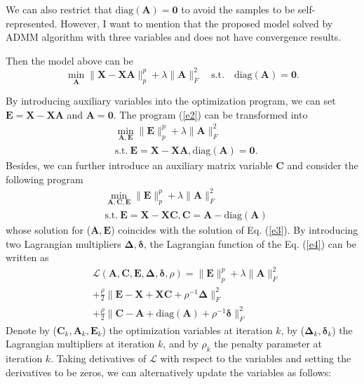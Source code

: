 \documentclass[10pt,twocolumn,letterpaper]{article}
\begin{document}
We can also restrict that $\text{diag}(\bm{A})=\bm{0}$ to avoid the samples to be self-represented. However, I want to mention that the proposed model solved by ADMM algorithm with three variables and does not have convergence results.

Then the model above can be 
\begin{equation}
\label{e2}
\min_{\bm{A}}
\|
\bm{X}
-
\bm{X}\bm{A}
\|_{p}^{p}
+
\lambda
\|
\bm{A}
\|_{F}^{2}
\quad
\text{s.t.}
\quad
\text{diag}(\bm{A})=\bm{0}.
\end{equation}

By introducing auxiliary variables into the optimization program, we can set 
$
\bm{E}
=
\bm{X}
-
\bm{X}\bm{A}
$ 
and 
$
\bm{A}
=
\bm{0}
$.
The program (\ref{e2}) can be transformed into
\begin{equation}
\begin{split}
\label{e3}
&
\min_{\bm{A},\bm{E}}
\|
\bm{E}
\|_{p}^{p}
+
\lambda
\|
\bm{A}
\|_{F}^{2}
\\
& 
\text{s.t.}
\ 
\bm{E}=\bm{X}-\bm{X}\bm{A}
,
\text{diag}(\bm{A})=\bm{0}.
\end{split}
\end{equation}
Besides, we can further introduce an auxiliary matrix variable $\bm{C}$ and consider the following program
\begin{equation}
\begin{split}
\label{e4}
&
\min_{\bm{A},\bm{C},\bm{E}}
\|
\bm{E}
\|_{p}^{p}
+
\lambda
\|
\bm{A}
\|_{F}^{2}
\\
& 
\text{s.t.}
\ 
\bm{E}=\bm{X}-\bm{X}\bm{C}
,
\bm{C}
=
\bm{A}
-
\text{diag}(\bm{A})
\end{split}
\end{equation}
whose solution for ($\bm{A},\bm{E}$) coincides with the solution of Eq. (\ref{e3}). By introducing two Lagrangian multipliers $\bm{\Delta},\bm{\delta}$, the Lagrangian function of the Eq. (\ref{e4}) can be written as
\begin{equation}
\begin{split}
\label{e5}
&
\mathcal{L}
(\bm{A},\bm{C},\bm{E},\bm{\Delta},\bm{\delta},\rho)
=
\|
\bm{E}
\|_{p}^{p}
+
\lambda
\|
\bm{A}
\|_{F}^{2}
\\
&
+
\frac{\rho}{2}
\|
\bm{E}-\bm{X}+\bm{X}\bm{C}+\rho^{-1}\bm{\Delta}
\|_{F}^{2}
\\
&
+
\frac{\rho}{2}
\|
\bm{C}-\bm{A}+\text{diag}(\bm{A})+\rho^{-1}\bm{\delta}
\|_{F}^{2}
\end{split}
\end{equation}
Denote by ($\bm{C}_{k},\bm{A}_{k},\bm{E}_{k}$) the optimization variables at iteration $k$, by ($\bm{\Delta}_{k},\bm{\delta}_{k}$) the Lagrangian multipliers at iteration $k$, and by $\rho_{k}$ the penalty parameter at iteration $k$. Taking detivatives of $\mathcal{L}$ with respect to the variables and setting the derivatives to be zeros, we can alternatively update the variables as follows:
\end{document}

